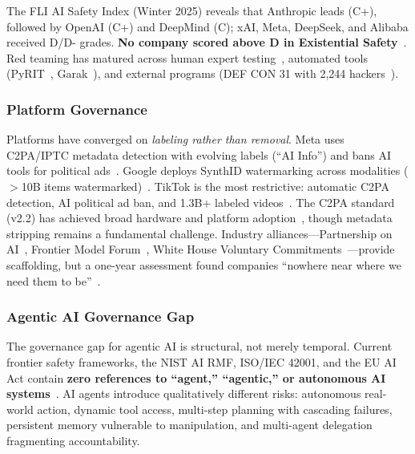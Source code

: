 The FLI AI Safety Index (Winter 2025) reveals that Anthropic leads (C+), followed by OpenAI (C+) and DeepMind (C); xAI, Meta, DeepSeek, and Alibaba received D/D- grades. \textbf{No company scored above D in Existential Safety}~\cite{fli2025winter}. Red teaming has matured across human expert testing~\cite{ganguli2022redteam}, automated tools (PyRIT~\cite{pyrit2024}, Garak~\cite{garak2024}), and external programs (DEF CON 31 with 2,244 hackers~\cite{defcon2023generativeredteam}).


\subsubsection{Platform Governance}
\label{sec:gov-platform}

Platforms have converged on \emph{labeling rather than removal}. Meta uses C2PA/IPTC metadata detection with evolving labels (``AI Info'') and bans AI tools for political ads~\cite{metalabeling2024}. Google deploys SynthID watermarking across modalities ($>$10B items watermarked)~\cite{synthid2025}. TikTok is the most restrictive: automatic C2PA detection, AI political ad ban, and 1.3B+ labeled videos~\cite{tiktok2023labels}. The C2PA standard (v2.2) has achieved broad hardware and platform adoption~\cite{c2pa2025}, though metadata stripping remains a fundamental challenge. Industry alliances---Partnership on AI~\cite{pai}, Frontier Model Forum~\cite{fmf2023}, White House Voluntary Commitments~\cite{whitehouse2023commitments}---provide scaffolding, but a one-year assessment found companies ``nowhere near where we need them to be''~\cite{mitreview2024assessment}.


\subsubsection{Agentic AI Governance Gap}
\label{sec:gov-agentic}


The governance gap for agentic AI is structural, not merely temporal. Current frontier safety frameworks, the NIST AI RMF, ISO/IEC 42001, and the EU AI Act contain \textbf{zero references to ``agent,'' ``agentic,'' or autonomous AI systems}~\cite{zenity2025blindspot}. AI agents introduce qualitatively different risks: autonomous real-world action, dynamic tool access, multi-step planning with cascading failures, persistent memory vulnerable to manipulation, and multi-agent delegation fragmenting accountability.

